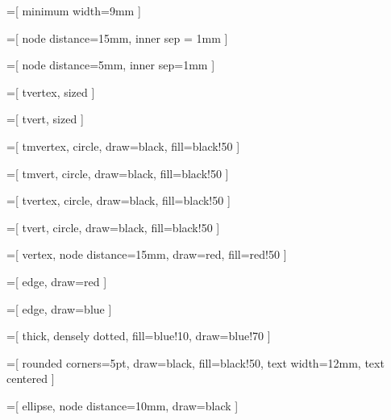 =[
    minimum width=9mm
]

=[
	node distance=15mm,
    inner sep = 1mm
]

=[
	node distance=5mm,
    inner sep=1mm
]

=[
    tvertex,
    sized
]

=[
    tvert,
    sized
]

=[
    tmvertex,
	circle,
	draw=black,
	fill=black!50
]

=[
    tmvert,
	circle,
	draw=black,
	fill=black!50
]

=[
    tvertex,
	circle,
	draw=black,
	fill=black!50
]

=[
    tvert,
	circle,
	draw=black,
	fill=black!50
]

=[
	vertex,
	node distance=15mm,
	draw=red,
	fill=red!50
]

=[
	edge,
	draw=red
]

=[
	edge,
	draw=blue
]

=[
	thick, %
	densely dotted,
	fill=blue!10,
	draw=blue!70
]

=[
    rounded corners=5pt,
    draw=black,
    fill=black!50,
    text width=12mm,
    text centered
]

=[
    ellipse,
    node distance=10mm,
    draw=black
]
\newcommand{\base}[4]{
    \draw[->] (0,0) to (0, #1);
    \draw[->] (0,0) to (#2, 0);
    
    \node at (0, #1+2) {#3};
    \node at (#2 + 2, -2) {#4};
}

\newenvironment{bitemize}{
    \begin{itemize}[label=$\bullet$]
}
{
    \end{itemize}
}
\renewcommand{\thepsubfig}{\alph{psubfig}}

\newcommand{\sfcaption}[1]{
    \addtocounter{figure}{1}
    \addtocounter{psubfig}{1}
    \textsc{Figure} \thefigure.\thepsubfig{} $-$ #1
    \addtocounter{figure}{-1}
}

